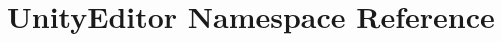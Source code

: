 \hypertarget{namespace_unity_editor}{}\section{Unity\+Editor Namespace Reference}
\label{namespace_unity_editor}
